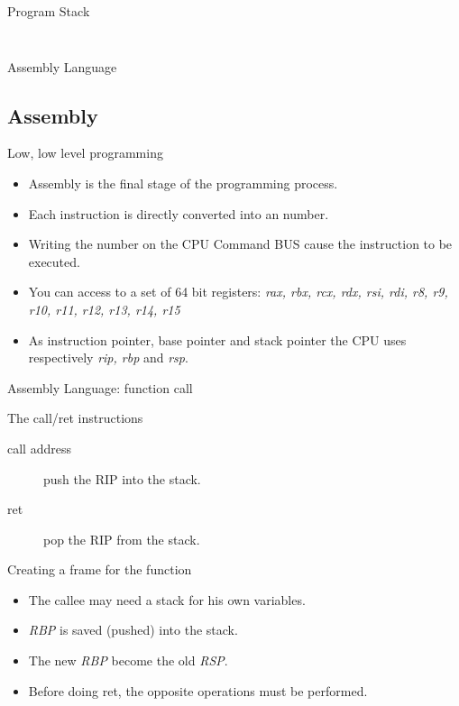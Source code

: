 \begin{frame}[fragile]{Program Stack}
\begin{columns}[T]
\begin{column}{.4\textwidth}
			\label{fig:frame1}
		\end{column}
	\end{columns}
\end{frame}
	

\begin{frame}{Assembly Language}
	\subsection{Assembly}
	\begin{block}{Low, low level programming}
		\begin{itemize}
			\item Assembly is the final stage of the programming process.
			\item Each instruction is directly converted into an number.
			\item Writing the number on the CPU Command BUS cause the instruction to
				be executed.
			\item You can access to a set of 64 bit registers:
				\emph{rax, rbx, rcx, rdx, rsi, rdi, r8, r9, r10, r11, r12, r13, r14, r15}
			\item As instruction pointer, base pointer and stack pointer the CPU uses respectively
				\emph{rip, rbp} and \emph{rsp}.
		\end{itemize}
	\end{block}
\end{frame}

\begin{frame}{Assembly Language: function call}
	\begin{block}{The call/ret instructions}
		\begin{description}
			\item[call address]push the RIP into the stack.
			\item[ret]pop the RIP from the stack.
		\end{description}
	\end{block}
	\begin{block}{Creating a frame for the function}
		\begin{itemize}
			\item The callee may need a stack for his own variables.
			\item \emph{RBP} is saved (pushed) into the stack.
			\item The new \emph{RBP} become the old \emph{RSP}.
			\item Before doing ret, the opposite operations must be performed.
		\end{itemize}
	\end{block}
\end{frame}

